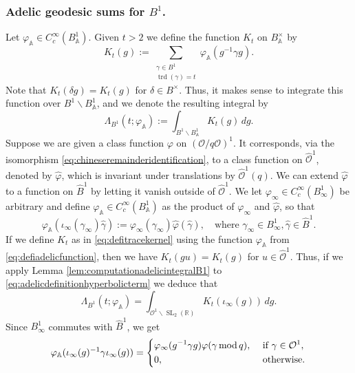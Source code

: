 \documentclass{article}
\theoremstyle{named}
\newcommand{\A}{\mathbb{A}}
\newcommand{\R}{\mathbb{R}}
\renewcommand{\O}{\mathcal{O}}
\DeclareMathOperator{\SL}{SL}
\DeclareMathOperator{\modulo}{mod}
\DeclareMathOperator{\trd}{trd}
\begin{document}
\subsubsection{Adelic geodesic sums for $B^1$.}
Let $\varphi_\A \in C_c^\infty(B_\A^1)$. Given $t > 2$ we define the function $K_t$ on $B_\A^\times$ by
\begin{equation}\label{eq:defitracekernel}
    K_t(g) := \sum_{\substack{\gamma \in B^1\\\trd(\gamma) = t}} \varphi_\A(g^{-1}\gamma g).
\end{equation}
Note that $K_t(\delta g) = K_t(g)$ for $\delta \in B^\times$. Thus, it makes sense to integrate this function over $B^1\backslash B_\A^1$, and we denote the resulting integral by  
\begin{equation}\label{eq:adelicdefinitionhyperbolicterm}
    \Lambda_{B^1}(t; \varphi_\A) := \int_{B^1\backslash B^1_\A} K_t(g) \, dg. 
\end{equation}
Suppose we are given a class function $\varphi$ on $(\O/q\O)^1$. It corresponds, via the isomorphism \eqref{eq:chineseremainderidentification}, to a class function on $\widehat{\O}^1$, denoted by $\widehat{\varphi}$, which is invariant under translations by $\widehat{\O}^1(q)$. We can extend $\widehat{\varphi}$ to a function on $\widehat{B}^1$ by letting it vanish outside of $\widehat{\O}^1$. We let $\varphi_\infty \in C_c^\infty(B_\infty^1)$ be arbitrary and define $\varphi_\A \in C_c^\infty(B_\A^1)$ as the product of $\varphi_\infty$ and $\widehat{\varphi}$, so that 
\begin{equation}\label{eq:defiadelicfunction}
    \varphi_\A(\iota_\infty(\gamma_\infty)\widehat{\gamma}) := \varphi_\infty(\gamma_\infty)\widehat{\varphi}(\widehat{\gamma}), \quad \text{where }\gamma_\infty \in B^1_\infty, \widehat{\gamma} \in \widehat{B}^1.
\end{equation}
If we define $K_t$ as in \eqref{eq:defitracekernel} using the function $\varphi_\A$ from \eqref{eq:defiadelicfunction}, then we have $K_t(gu) = K_t(g)$ for $u \in \widehat{\O}^1$. Thus, if we apply Lemma \ref{lem:computationadelicintegralB1} to \eqref{eq:adelicdefinitionhyperbolicterm} we deduce that 
\begin{equation*}
    \Lambda_{B^1}(t; \varphi_\A) = \int_{\O^1 \backslash \SL_2(\R)} K_t(\iota_\infty(g)) \, dg. 
\end{equation*}
Since $B_\infty^1$ commutes with $\widehat{B}^1$, we get  
\begin{equation*}
    \varphi_\A(\iota_\infty(g)^{-1}\gamma \iota_\infty(g)) = \begin{dcases}
        \varphi_\infty(g^{-1}\gamma g) \varphi(\gamma \modulo q), & \text{ if }\gamma \in \O^1,\\
        0, & \text{ otherwise}.
    \end{dcases}
\end{equation*}
\end{document}
